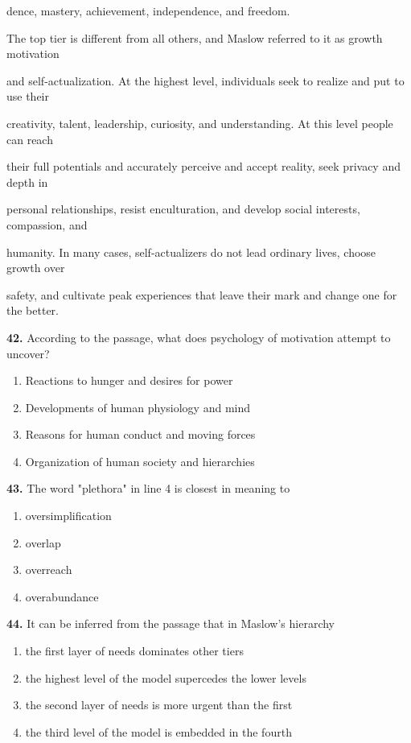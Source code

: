 \documentclass[12pt]{article}
\begin{document}
dence, mastery, achievement, independence, and freedom.\par
The top tier is different from all others, and Maslow referred to it as growth motivation\par
and self-actualization. At the highest level, individuals seek to realize and put to use their\par
creativity, talent, leadership, curiosity, and understanding. At this level people can reach\par
their full potentials and accurately perceive and accept reality, seek privacy and depth in\par
personal relationships, resist enculturation, and develop social interests, compassion, and\par
humanity. In many cases, self-actualizers do not lead ordinary lives, choose growth over\par
safety, and cultivate peak experiences that leave their mark and change one for the better.\par
\endgroup
\medskip
\noindent\textbf{42.} According to the passage, what does psychology of motivation attempt to uncover?
\begin{enumerate}[label=(\Alph*),leftmargin=*,itemsep=0.2em]
\item Reactions to hunger and desires for power
\item Developments of human physiology and mind
\item Reasons for human conduct and moving forces
\item Organization of human society and hierarchies
\end{enumerate}
\par
\vspace{0.25\baselineskip}
\noindent\textbf{43.} The word "plethora" in line 4 is closest in meaning to
\begin{enumerate}[label=(\Alph*),leftmargin=*,itemsep=0.2em]
\item oversimplification
\item overlap
\item overreach
\item overabundance
\end{enumerate}
\par
\vspace{0.25\baselineskip}
\noindent\textbf{44.} It can be inferred from the passage that in Maslow's hierarchy
\begin{enumerate}[label=(\Alph*),leftmargin=*,itemsep=0.2em]
\item the first layer of needs dominates other tiers
\item the highest level of the model supercedes the lower levels
\item the second layer of needs is more urgent than the first
\item the third level of the model is embedded in the fourth
\end{enumerate}
\end{document}
